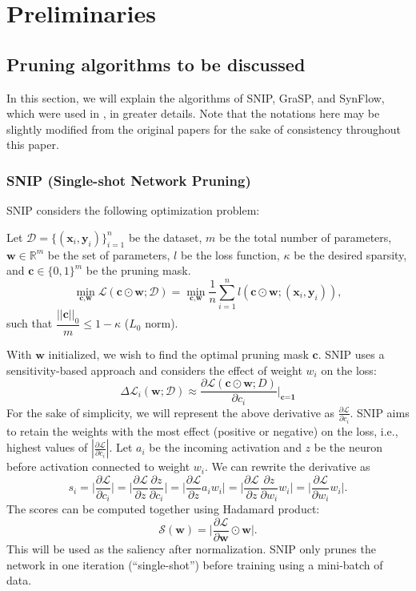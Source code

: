 \chapter{Preliminaries}
\label{ch:prelim}
\vspace{1em}

\section{Pruning algorithms to be discussed}
In this section, we will explain the algorithms of SNIP, GraSP, and SynFlow, which were used in \textcite{frankle21}, in greater details. Note that the notations here may be slightly modified from the original papers for the sake of consistency throughout this paper.

\subsection{SNIP (Single-shot Network Pruning)}
SNIP considers the following optimization problem:

Let $\mathcal{D} = \{(\textbf{x}_i, \textbf{y}_i)\}_{i=1}^n$ be the dataset, $m$ be the total number of parameters, $\textbf{w} \in \mathbb{R}^m$ be the set of parameters, $l$ be the loss function, $\kappa$ be the desired sparsity, and $\textbf{c} \in \{0, 1\}^m$ be the pruning mask.
$$\mathop{\min}_{\textbf{c}, \textbf{w}} \mathcal{L}(\textbf{c} \odot \textbf{w}; \mathcal{D}) = \mathop{\min}_{\textbf{c}, \textbf{w}} \frac{1}{n} \sum_{i=1}^n l(\textbf{c} \odot \textbf{w}; (\textbf{x}_i, \textbf{y}_i)),$$
such that $\dfrac{||\textbf{c}||_0}{m} \leq 1-\kappa$ ($L_0$ norm).

With $\textbf{w}$ initialized, we wish to find the optimal pruning mask $\textbf{c}$. SNIP uses a sensitivity-based approach and considers the effect of weight $w_i$ on the loss:
$$\Delta \mathcal{L}_i(\textbf{w};\mathcal{D}) \approx \dfrac{\partial \mathcal{L}(\textbf{c} \odot \textbf{w}; D)}{\partial c_i} \bigg|_{\textbf{c}=\textbf{1}}$$
For the sake of simplicity, we will represent the above derivative as $\frac{\partial \mathcal{L}}{\partial c_i}$. SNIP aims to retain the weights with the most effect (positive or negative) on the loss, i.e., highest values of $|\frac{\partial \mathcal{L}}{\partial c_i}|$.
Let $a_i$ be the incoming activation and $z$ be the neuron before activation connected to weight $w_i$. We can rewrite the derivative as
$$s_i = \Big|\frac{\partial \mathcal{L}}{\partial c_i}\Big| = \Big|\frac{\partial \mathcal{L}}{\partial z}\frac{\partial z}{\partial c_i}\Big| = \Big|\frac{\partial \mathcal{L}}{\partial z}a_iw_i\Big| = \Big|\frac{\partial \mathcal{L}}{\partial z}\frac{\partial z}{\partial w_i}w_i\Big| = \Big|\frac{\partial \mathcal{L}}{\partial w_i}w_i\Big|.$$
The scores can be computed together using Hadamard product:
$$\mathcal{S}(\textbf{w}) = \Big|\frac{\partial \mathcal{L}}{\partial \textbf{w}} \odot \textbf{w}\Big|.$$
This will be used as the saliency after normalization. SNIP only prunes the network in one iteration (``single-shot'') before training using a mini-batch of data.

